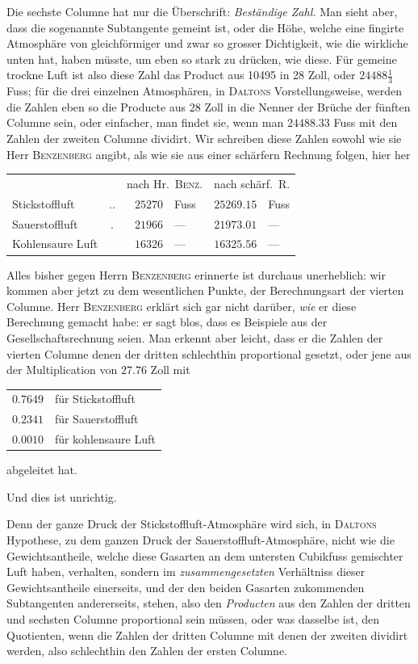 Die sechste Columne hat nur die Überschrift: \textit{Beständige Zahl.} Man sieht aber, dass die sogenannte Subtangente gemeint ist, oder die Höhe, welche eine fingirte Atmosphäre von gleichförmiger und zwar so grosser Dichtigkeit, wie die wirkliche unten hat, haben müsste, um eben so stark zu drücken, wie diese. Für gemeine trockne Luft ist also diese Zahl das Product aus 10495 in 28 Zoll, oder $24488\frac{1}{3}$ Fuss; für die drei einzelnen Atmosphären, in \textsc{Daltons} Vorstellungsweise, werden die Zahlen eben so die Producte aus 28 Zoll in die Nenner der Brüche der fünften Columne sein, oder einfacher, man findet sie, wenn man $24488.33$ Fuss mit den Zahlen der zweiten Columne dividirt. Wir schreiben diese Zahlen
sowohl wie sie Herr \textsc{Benzenberg} angibt, als wie sie aus einer schärfern Rechnung folgen, hier her
\begin{center}\begin{tabular}{lcrlrl}
& & \multicolumn{2}{c}{nach Hr.\ \textsc{Benz}.} & \multicolumn{2}{c}{nach schärf.\ R.}\\
Stickstoffluft & .\quad . & $25270$ & Fuss & $25269.15$ & Fuss\\
Sauerstoffluft & . & $21966$ & — & $21973.01$ & —\\
Kohlensaure Luft & & $16326$ & — & $16325.56$ & —
\end{tabular}\end{center}

Alles bisher gegen Herrn \textsc{Benzenberg} erinnerte ist durchaus unerheblich: wir kommen aber jetzt zu dem wesentlichen Punkte, der Berechnungsart der vierten Columne. Herr \textsc{Benzenberg} erklärt sich gar nicht darüber, \textit{wie} er diese Berechnung gemacht habe: er sagt blos, dass es Beispiele aus der Gesellschaftsrechnung seien. Man erkennt aber leicht, dass er die Zahlen der vierten Columne denen der dritten schlechthin proportional gesetzt, oder jene aus der Multiplication von $27.76$ Zoll mit
\begin{center}\begin{tabular}{rl}
$0.7649$ & für Stickstoffluft\\
$0.2341$ & für Sauerstoffluft\\
$0.0010$ & für kohlensaure Luft
\end{tabular}\end{center}
abgeleitet hat.

Und dies ist unrichtig.

Denn der ganze Druck der Stickstoffluft-Atmosphäre wird sich, in \textsc{Daltons} Hypothese, zu dem ganzen Druck der Sauerstoffluft-Atmosphäre, nicht wie die Gewichtsantheile, welche diese Gasarten an dem untersten Cubikfuss gemischter Luft haben, verhalten, sondern im \textit{zusammengesetzten} Verhältniss dieser Gewichtsantheile einerseits, und der den beiden Gasarten zukommenden Subtangenten andererseits, stehen, also den \textit{Producten} aus den Zahlen der dritten und sechsten Columne proportional sein müssen, oder was dasselbe ist, den Quotienten, wenn die Zahlen der dritten Columne mit denen der zweiten dividirt werden, also schlechthin den Zahlen der ersten Columne.

